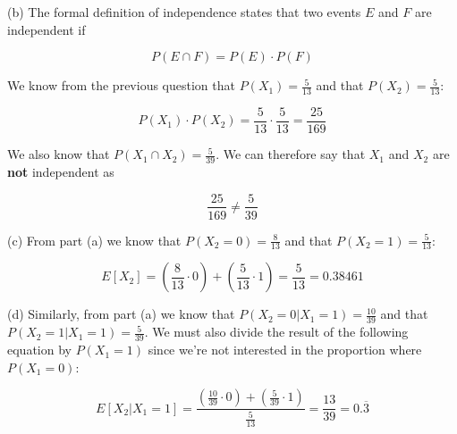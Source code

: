 \documentclass[12pt]{article}
\begin{document}
\noindent (b) The formal definition of independence states that two events $E$ and $F$ are independent if

$$P(E \cap F) = P(E) \cdot P(F)$$

\indent We know from the previous question that $P(X_1) = \frac{5}{13}$ and that $P(X_2) = \frac{5}{13}$:

$$P(X_1) \cdot P(X_2) = \frac{5}{13} \cdot \frac{5}{13} = \frac{25}{169}$$

\indent We also know that $P(X_1 \cap X_2) = \frac{5}{39}$. We can therefore say that $X_1$ and $X_2$ are {\bf not} independent as

$$\frac{25}{169} \neq \frac{5}{39}$$

\noindent (c) From part (a) we know that $P(X_2 = 0) = \frac{8}{13}$ and that $P(X_2 = 1) = \frac{5}{13}$:

$$E[X_2] = \left( \frac{8}{13} \cdot 0 \right) + \left( \frac{5}{13} \cdot 1 \right) = \frac{5}{13} = 0.38461$$

\noindent (d) Similarly, from part (a) we know that $P(X_2 = 0 | X_1 = 1) = \frac{10}{39}$ and that $P(X_2 = 1 | X_1 = 1) = \frac{5}{39}$. We must also divide the result of the following equation by $P(X_1 = 1)$ since we're not interested in the proportion where $P(X_1 = 0)$:

$$E[X_2 | X_1 = 1] = \frac{\left( \frac{10}{39} \cdot 0 \right) + \left( \frac{5}{39} \cdot 1 \right)}{\frac{5}{13}} = \frac{13}{39} = 0.\overline{3}$$
\end{document}
